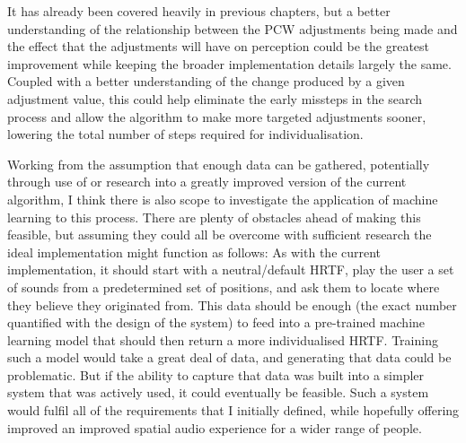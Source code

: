 It has already been covered heavily in previous chapters, but a better understanding of the relationship between the PCW adjustments being made and the effect that the adjustments will have on perception could be the greatest improvement while keeping the broader implementation details largely the same. Coupled with a better understanding of the change produced by a given adjustment value, this could help eliminate the early missteps in the search process and allow the algorithm to make more targeted adjustments sooner, lowering the total number of steps required for individualisation.

Working from the assumption that enough data can be gathered, potentially through use of or research into a greatly improved version of the current algorithm, I think there is also scope to investigate the application of machine learning to this process. There are plenty of obstacles ahead of making this feasible, but assuming they could all be overcome with sufficient research the ideal implementation might function as follows: As with the current implementation, it should start with a neutral/default HRTF, play the user a set of sounds from a predetermined set of positions, and ask them to locate where they believe they originated from. This data should be enough (the exact number quantified with the design of the system) to feed into a pre-trained machine learning model that should then return a more individualised HRTF. Training such a model would take a great deal of data, and generating that data could be problematic. But if the ability to capture that data was built into a simpler system that was actively used, it could eventually be feasible. Such a system would fulfil all of the requirements that I initially defined, while hopefully offering improved an improved spatial audio experience for a wider range of people.
